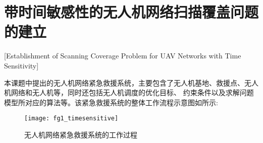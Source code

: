 \section{带时间敏感性的无人机网络扫描覆盖问题的建立}[Establishment of Scanning Coverage Problem for UAV Networks with Time Sensitivity]

本课题中提出的无人机网络紧急救援系统，主要包含了无人机基地、救援点、无人机网络和无人机等，同时还包括无人机调度的优化目标、
约束条件以及求解问题模型所对应的算法等。该紧急救援系统的整体工作流程示意图如所示:

\begin{figure}[ht]
	\centering
	\texttt{[image: fg1\_timesensitive]}
	\caption{无人机网络紧急救援系统的工作过程}
	\label{fg201}
\end{figure}

